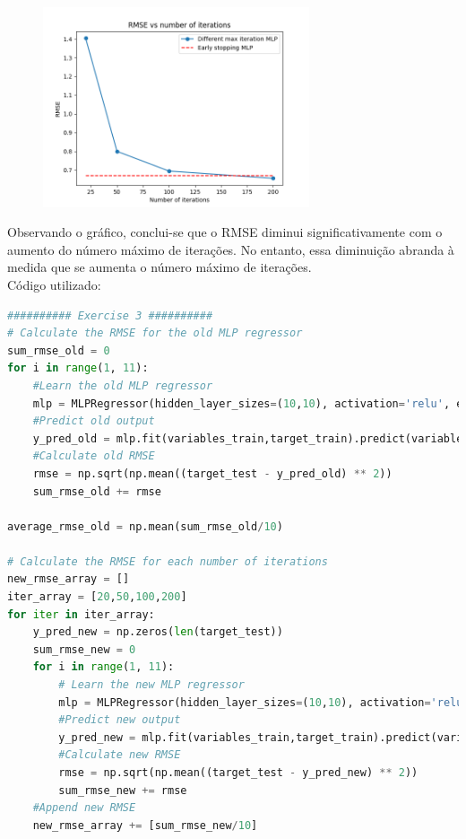 \documentclass[a4paper,12pt]{article} %
\begin{document}
\begin{enumerate}
\begin{figure}[H]
\centering
\includegraphics[width=0.7\textwidth]{ex3_rmse.png}
\end{figure}

Observando o gráfico, conclui-se que o RMSE diminui significativamente com o aumento do número máximo de iterações.
No entanto, essa diminuição abranda à medida que se aumenta o número máximo de iterações.\\

Código utilizado:

\begin{lstlisting}[language=Python]
########## Exercise 3 ##########
# Calculate the RMSE for the old MLP regressor
sum_rmse_old = 0
for i in range(1, 11):
    #Learn the old MLP regressor
    mlp = MLPRegressor(hidden_layer_sizes=(10,10), activation='relu', early_stopping=True, validation_fraction=0.2, random_state=i)
    #Predict old output
    y_pred_old = mlp.fit(variables_train,target_train).predict(variables_test)
    #Calculate old RMSE
    rmse = np.sqrt(np.mean((target_test - y_pred_old) ** 2))
    sum_rmse_old += rmse

average_rmse_old = np.mean(sum_rmse_old/10)

# Calculate the RMSE for each number of iterations
new_rmse_array = []
iter_array = [20,50,100,200]
for iter in iter_array:
    y_pred_new = np.zeros(len(target_test))
    sum_rmse_new = 0
    for i in range(1, 11):
        # Learn the new MLP regressor 
        mlp = MLPRegressor(hidden_layer_sizes=(10,10), activation='relu', max_iter = iter, random_state=i)
        #Predict new output
        y_pred_new = mlp.fit(variables_train,target_train).predict(variables_test)
        #Calculate new RMSE
        rmse = np.sqrt(np.mean((target_test - y_pred_new) ** 2))
        sum_rmse_new += rmse
    #Append new RMSE
    new_rmse_array += [sum_rmse_new/10]


\end{lstlisting}
\end{enumerate}
\end{document}
